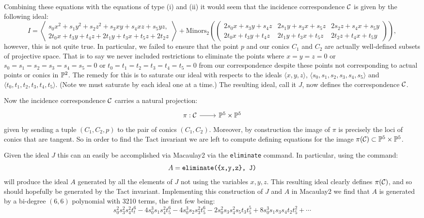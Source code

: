 Combining these equations with the equations of type (i) and (ii) it would seem that the incidence correspondence $\cC$ is given by the following ideal:
\[
I=\left\langle \begin{matrix}
s_0x^2+s_1y^2+s_2z^2+s_3xy+s_4xz+s_5yz,\\
2t_0x+t_3y+t_4z + 2t_1y+t_3x+t_5z+2t_2z
\end{matrix}
\right\rangle+\text{Minors}_{2}\left(\begin{pmatrix}
2s_0x+s_3y+s_4z & 2s_1y+s_3x+s_5z & 2s_2z+s_4x+s_5y\\
2t_0x+t_3y+t_4z & 2t_1y+t_3x+t_5z & 2t_2z+t_4x+t_5y
\end{pmatrix}\right),
\]
however, this is not quite true. In particular, we failed to ensure that the point $p$ and our conics $C_1$ and $C_2$ are actually well-defined subsets of projective space. That is to say we never included restrictions to eliminate the points where $x=y=z=0$ or $s_0=s_1=s_2=s_3=s_4=s_5=0$ or $t_0=t_1=t_2=t_3=t_4=t_5=0$ from our correspondence despite these points not corresponding to actual points or conics in $\P^2$. The remedy for this is to saturate our ideal with respects to the ideals $\langle x,y,z\rangle$, $\langle s_0,s_1,s_2,s_3,s_4,s_5\rangle$ and $\langle t_0,t_1,t_2,t_3,t_4,t_5\rangle$. (Note we must saturate by each ideal one at a time.) The resulting ideal, call it $J$, now defines the correspondence $\cC$. 

Now the incidence correspondence $\cC$ carries a natural projection:
\[
\begin{tikzcd}
\pi:\cC\rar{}& \P^5\times \P^5
\end{tikzcd}
\]
given by sending a tuple $(C_1,C_2,p)$ to the pair of conics $(C_1, C_2)$. Moreover, by construction the image of $\pi$ is precisely the loci of conics that are tangent. So in order to find the Tact invariant we are left to compute defining equations for the image $\pi(\cC)\subset\P^5\times\P^5$.

Given the ideal $J$ this can an easily be accomplished via Macaulay2 via the \verb+eliminate+ command. In particular, using the command:
\[
A=\verb+eliminate({x,y,z}, J)+
\]
will produce the ideal $A$ generated by all the elements of $J$ not using the variables $x,y,z$. This resulting ideal clearly defines $\pi(\cC)$, and so should hopefully be generated by the Tact invariant. Implementing this construction of $J$ and $A$ in Macaulay2 we find that $A$ is generated by a bi-degree $(6,6)$ polynomial with 3210 terms, the first few being:
\[
s_0^2s_3^2s_4^2t_t^6-4s_0^3s_1s_4^2t_5^6-4s_0^3s_2s_3^2t_5^6-2s_0^2s_3s_4^2s_5t_3t_5^5+8s_0^3s_1s_3s_4t_2t_5^2+\cdots
\]

